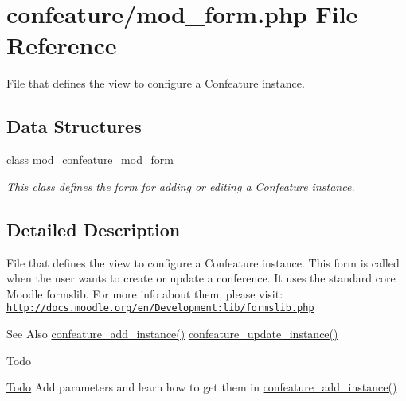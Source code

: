 \hypertarget{mod__form_8php}{\section{confeature/mod\-\_\-form.php File Reference}
\label{mod__form_8php}
}


File that defines the view to configure a Confeature instance.  


\subsection*{Data Structures}
\begin{DoxyCompactItemize}
\item 
class \hyperlink{classmod__confeature__mod__form}{mod\-\_\-confeature\-\_\-mod\-\_\-form}
\begin{DoxyCompactList}\small\item\em This class defines the form for adding or editing a Confeature instance. \end{DoxyCompactList}\end{DoxyCompactItemize}


\subsection{Detailed Description}
File that defines the view to configure a Confeature instance. This form is called when the user wants to create or update a conference. It uses the standard core Moodle formslib. For more info about them, please visit\-: \href{http://docs.moodle.org/en/Development:lib/formslib.php}{\tt http\-://docs.\-moodle.\-org/en/\-Development\-:lib/formslib.\-php} \begin{DoxySeeAlso}{See Also}
\hyperlink{lib_8php_a7e22c75c28ab3ae8b48c1d332f648fc5}{confeature\-\_\-add\-\_\-instance()} \hyperlink{lib_8php_a55bc12394a95bb1e3e069ce5a6e79c8f}{confeature\-\_\-update\-\_\-instance()} 
\end{DoxySeeAlso}
\begin{DoxyRefDesc}{Todo}
\item[\hyperlink{todo__todo000008}{Todo}]Add parameters and learn how to get them in \hyperlink{lib_8php_a7e22c75c28ab3ae8b48c1d332f648fc5}{confeature\-\_\-add\-\_\-instance()} \end{DoxyRefDesc}
